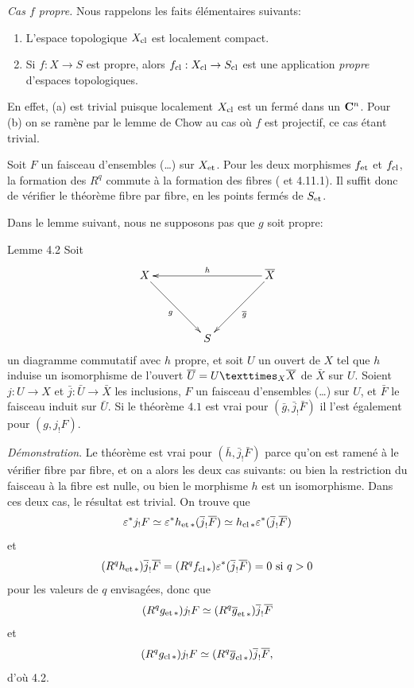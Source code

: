 \documentclass[10pt]{../fichiers-configuration-latex/smfart}
\begin{document}
\emph{Cas $f$ propre.} Nous rappelons les faits élémentaires suivants:
\begin{enumerate}
\renewcommand{\theenumi}{\alph{enumi}}
\renewcommand{\labelenumi}{(\theenumi)}
\item L'espace topologique $X_{\cl}$ est localement compact.

\item Si $f:X\rightarrow S$ est propre, alors
$f_{\cl}:X_{\cl}\rightarrow S_{\cl}$ est une application \emph{propre}
d'espaces topologiques.
\end{enumerate}

En effet, (a) est trivial puisque localement $X_{\cl}$ est un fermé
dans un $\CC^n$. Pour (b) on se ramène par le lemme de Chow au
cas où $f$ est projectif, ce cas étant trivial.

Soit $F$ un faisceau d'ensembles (\resp\ldots) sur $X_{\et}$. 
Pour les deux morphismes $f_{\et}$ et $f_{\cl}$, la
formation des $R^{q}$ commute à la formation des fibres ( et
\cite{SGA4-16:2} 4.11.1). Il suffit donc de vérifier le théorème fibre par fibre,
en les points fermés de $S_{\et}$.

Dans le lemme suivant, nous ne supposons pas que $g$ soit propre:

\begin{enonce*}{Lemme 4.2}
Soit\pageoriginale
$$
\xymatrix@=1.5cm{
X  \ar[rd]_{g}& &\bar{X} \ar[ll]_{h}\ar[ld]^{\bar{g}}\\
& S &
}
$$
un diagramme commutatif avec $h$ propre, et soit $U$ un ouvert de $X$
tel que $h$ induise un isomorphisme de l'ouvert
$\bar{U}=\fprod{U}{\bar{X}}{X}$ de $\bar{X}$ sur $U$. Soient
$j:U\rightarrow X$ et $\bar{j}:\bar{U}\rightarrow \bar{X}$ les
inclusions, $F$ un faisceau d'ensembles (\resp\ldots) sur $U$, et
$\bar{F}$ le faisceau induit sur $\bar{U}$. Si le théorème $4.1$ est
vrai pour $(\bar{g},\bar{j}_{!}\bar{F})$ il l'est également pour $(g,j_{!}F)$.
\end{enonce*}

\noindent
\emph{Démonstration}. Le théorème est vrai pour
$(\bar{h},\bar{j}_{!}\bar{F})$ parce qu'on est ramené à le vérifier
fibre par fibre, et on a alors les deux cas suivants: ou bien la
restriction du faisceau à la fibre est nulle, ou bien le morphisme $h$
est un isomorphisme. Dans ces deux cas, le résultat est trivial. On
trouve que
$$
\epsilon^{\ast}j_{!}F\simeq \epsilon {}^{\ast}h_{\text{\rm
et\,}\ast}(\bar{j}_{!}\bar{F})\simeq
h_{\cl\ast}\epsilon^{\ast}(\bar{j}_{!}\bar{F})
$$
et
$$
(R^{q}h_{\text{\rm
et\,}\ast})\bar{j}_{!}\bar{F}=(R^{q}f_{\cl\ast})\epsilon^{\ast}(\bar{j}_{!}\bar{F})=0\text{ si } q>0
$$
pour les valeurs de $q$ envisagées, donc que
$$
(R^{q}g_{\text{\rm et\,}\ast})j_{!}F\simeq (R^{q}\bar{g}_{\text{\rm
et\,}\ast})\bar{j}_{!}\bar{F}
$$
et 
$$
(R^{q}g_{\cl \ast})j_{!}F\simeq (R^{q}\bar{g}_{\cl
\ast})\bar{j}_{!}\bar{F}{\quoi},
$$
d'où 4.2.\pageoriginale
\end{document}
